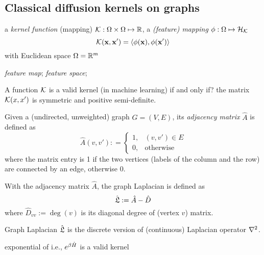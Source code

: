 \subsection{Classical diffusion kernels on graphs}
\cite{kondorDiffusionKernelsGraphs2002}
a \emph{kernel function} (mapping) $\mathcal{K}: \Omega\times\Omega\mapsto\mathbb{R}$,
a \emph{(feature) mapping} $\phi:\Omega\mapsto\mathcal{H}_{\mathcal{K}}$
\begin{equation}
	\mathcal{K}(\vb{x},\vb{x}') = \langle \phi(\vb{x}),\phi(\vb{x}') \rangle
\end{equation}
with Euclidean space $\Omega = \mathbb{R}^m$
\begin{definition}\label{def:feature_map}
	\emph{feature map};
	\emph{feature space};
\end{definition}
\begin{definition}\label{def:kernel}
	A function $\mathcal{K}$ is a valid kernel (in machine learning) if and only if? the matrix $\mathcal{K}(x,x')$ is symmetric and positive semi-definite.
\end{definition}
\begin{definition}\label{def:adjacency_matrix}
	Given a (undirected, unweighted) graph $G=(V,E)$, its \emph{adjacency matrix} $\hat{A}$ is defined as
	\begin{equation}
		\hat{A}(v,v') : = 
		\begin{cases}
			1, & (v,v') \in E \\
			0, & \text{otherwise}
		\end{cases}
	\end{equation}
	where the matrix entry is 1 if the two vertices (labels of the column and the row) are connected by an edge, otherwise 0.
\end{definition}
\begin{definition}\label{def:graph_laplacian}
	With the adjacency matrix $\hat{A}$, the graph Laplacian is defined as
	\begin{equation}
		\hat{\mathfrak{L}}:=\hat{A}-\hat{D}	
	\end{equation}
	where $\hat{D}_{vv}:=\deg(v)$ is its diagonal degree of (vertex $v$) matrix.
\end{definition}
\begin{remark}
	Graph Laplacian $\hat{\mathfrak{L}}$ is the 
	discrete version of (continuous) Laplacian operator $\laplacian$.
\end{remark}
\begin{lemma}
	exponential of i.e., $e^{\beta \hat{H}}$ is a valid kernel
\end{lemma}

